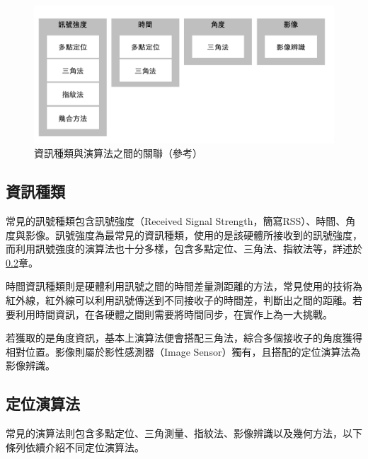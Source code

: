     \begin{figure}[htpb]
        \centering
        \includegraphics[width=15cm]{ch2pic/method_sort.png}
        \caption{資訊種類與演算法之間的關聯（參考\cite{survey_light2018}）}
        \label{pic:method_sort}
    \end{figure}
    
    \subsection{資訊種類}

    常見的訊號種類包含訊號強度（Received Signal Strength，簡寫RSS）、時間、角度與影像。訊號強度為最常見的資訊種類\cite{survey_indoor2018}，使用的是該硬體所接收到的訊號強度，而利用訊號強度的演算法也十分多樣，包含多點定位、三角法、指紋法等，詳述於\ref{chp:method-algorithm}章。

    時間資訊種類則是硬體利用訊號之間的時間差量測距離的方法，常見使用的技術為紅外線，紅外線可以利用訊號傳送到不同接收子的時間差，判斷出之間的距離。若要利用時間資訊，在各硬體之間則需要將時間同步，在實作上為一大挑戰\cite{survey_indoor2014}。

    若獲取的是角度資訊，基本上演算法便會搭配三角法，綜合多個接收子的角度獲得相對位置。影像則屬於影性感測器（Image Sensor）獨有，且搭配的定位演算法為影像辨識。


    \subsection{定位演算法}
    \label{chp:method-algorithm}

    常見的演算法則包含多點定位、三角測量、指紋法、影像辨識以及幾何方法，以下條列依續介紹不同定位演算法。

